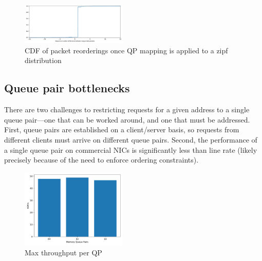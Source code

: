 \begin{figure}[t]
    \includegraphics[width=0.45\textwidth]{fig/qp_reordering.pdf}
    \caption{CDF of packet reorderings once QP mapping is applied to a zipf distribution}
    \label{fig:reorder}
\end{figure}

\subsection{Queue pair bottlenecks}

 There are two challenges to restricting requests for a given address
 to a single queue pair---one that can be worked around, and one that
 must be addressed.  First, queue pairs are established on a
 client/server basis, so requests from different clients must arrive
 on different queue pairs.  Second, the performance of a single queue
 pair on commercial NICs is significantly less than line rate (likely
 precisely because of the need to enforce ordering constraints).

\begin{figure}[t]
    \includegraphics[width=0.45\textwidth]{fig/qp_bottleneck.pdf}
    \caption{Max throughput per QP }
    \label{fig:qp_bottleneck}
\end{figure}

 





